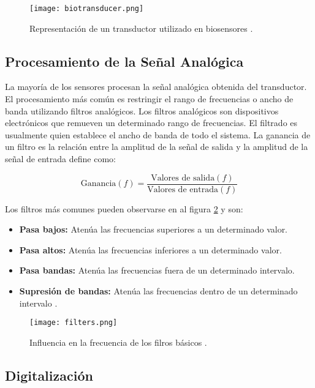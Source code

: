 \begin{figure}[H]
	\centering
    \texttt{[image: biotransducer.png]}
    \caption{Representación de un transductor utilizado en biosensores \cite{biosignal-book}.}
	\label{fig:biotransducer}
\end{figure}

\subsection{Procesamiento de la Señal Analógica}

La mayoría de los sensores procesan la señal analógica obtenida del transductor. El procesamiento más común es restringir el rango de frecuencias o ancho de banda utilizando filtros analógicos. Los filtros analógicos son dispositivos electrónicos que remueven un determinado rango de frecuencias. El filtrado es usualmente quien establece el ancho de banda de todo el sistema. La ganancia de un filtro es la relación entre la amplitud de la señal de salida y la amplitud de la señal de entrada define como:

$$ \textrm{Ganancia} (f) = \frac{\textrm{Valores de salida} (f)}{\textrm{Valores de entrada} (f)}  $$

Los filtros más comunes pueden observarse en al figura \ref{fig:filters} y son: 

\begin{itemize}
\item \textbf{Pasa bajos:} Atenúa las frecuencias superiores a un determinado valor. 
\item \textbf{Pasa altos:} Atenúa las frecuencias inferiores a un determinado valor. 
\item \textbf{Pasa bandas:} Atenúa las frecuencias fuera de un determinado intervalo.
\item \textbf{Supresión de bandas:} Atenúa las frecuencias dentro de un determinado intervalo \cite{biosignal-book}.

\end{itemize}

\begin{figure}[H]
	\centering
    \texttt{[image: filters.png]}
    \caption{Influencia en la frecuencia de los filros básicos \cite{biosignal-book}.}
	\label{fig:filters}
\end{figure}

\subsection{Digitalización}

